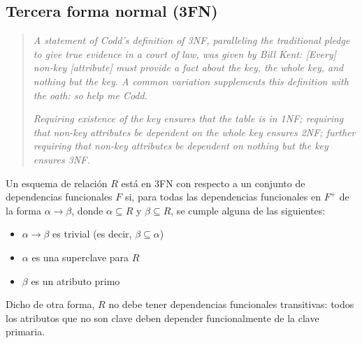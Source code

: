 \documentclass[a4paper, twoside]{article}
\begin{document}
\subsection{Tercera forma normal (3FN)}
\begin{quote}
\emph{A statement of Codd's definition of 3NF, paralleling the traditional
pledge to give true evidence in a court of law, was given by Bill
Kent: {[}Every{]} non-key {[}attribute{]} must provide
a fact about the key, the whole key, and nothing but the key.
A common variation supplements this definition with the oath: so
help me Codd.}

\emph{Requiring existence of the key
ensures that the table is in 1NF; requiring that non-key attributes
be dependent on the whole key ensures
2NF; further requiring that non-key attributes be dependent on nothing
but the key ensures 3NF.}
\end{quote}
Un esquema de relación $R$ está en 3FN con respecto a un conjunto
de dependencias funcionales $F$ si, para todas las dependencias funcionales
en $F^{+}$ de la forma $\alpha\to\beta$, donde $\alpha\subseteq R$
y $\beta\subseteq R$, se cumple alguna de las siguientes:
\begin{itemize}
\item $\alpha\to\beta$ es trivial (es decir, $\beta\subseteq\alpha$)
\item $\alpha$ es una superclave para $R$ 
\item $\beta$ es un atributo primo
\end{itemize}
Dicho de otra forma, $R$ no debe tener dependencias funcionales transitivas:
todos los atributos que no son clave deben depender funcionalmente
de la clave primaria.
\end{document}

